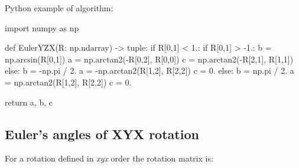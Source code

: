     Python example of algorithm:

\begin{python}
import numpy as np

def EulerYZX(R: np.ndarray) -> tuple:
    if R[0,1] < 1.:
        if R[0,1] > -1.:
            b = np.arcsin(R[0,1])
            a = np.arctan2(-R[0,2], R[0,0])
            c = np.arctan2(-R[2,1], R[1,1])
        else:
            b = -np.pi / 2.
            a = -np.arctan2(R[1,2], R[2,2])
            c = 0.
    else:
        b = np.pi / 2.
        a = np.arctan2(R[1,2], R[2,2])
        c = 0.

    return a, b, c
\end{python}

\subsection{Euler's angles of \textbf{XYX} rotation}

    For a rotation defined in \textit{xyx} order the rotation matrix is:

